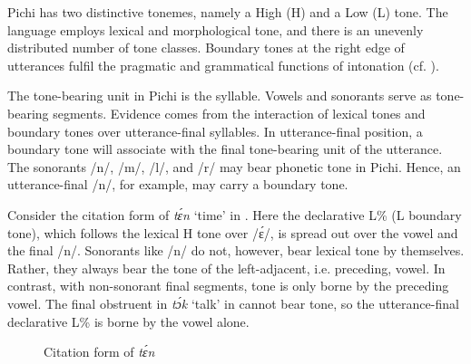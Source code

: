 \largerpage[2]
Pichi has two distinctive tonemes, namely a High (H) and a Low (L) tone. The language employs lexical and morphological tone, and there is an unevenly distributed number of tone classes. Boundary tones at the right edge of utterances fulfil the pragmatic and grammatical functions of intonation (cf. ).

The tone-bearing unit in Pichi is the syllable. Vowels and sonorants serve as tone-bearing segments. Evidence comes from the interaction of lexical tones and boundary tones over utterance-final syllables. In utterance-final position, a boundary tone will associate with the final tone-bearing unit of the utterance. The sonorants /n/, /m/, /l/, and /r/ may bear phonetic tone in Pichi. Hence, an utterance-final /n/, for example, may carry a boundary tone. 

Consider the citation form of \textit{tɛ́n} ‘time’ in . Here the declarative L\% (L boundary tone), which follows the lexical H tone over /ɛ́/, is spread out over the vowel and the final /n/. Sonorants like /n/ do not, however, bear lexical tone by themselves. Rather, they always bear the tone of the left-adjacent, i.e. preceding, vowel. In contrast, with non-sonorant final segments, tone is only borne by the preceding vowel. The final obstruent in \textit{tɔ́k} ‘talk’ in  cannot bear tone, so the utterance-final declarative L\% is borne by the vowel alone.
\largerpage

	
\begin{figure}
	\caption{Citation form of \textit{tɛ́n}}
	\label{fig:key:3.1}
\end{figure}

